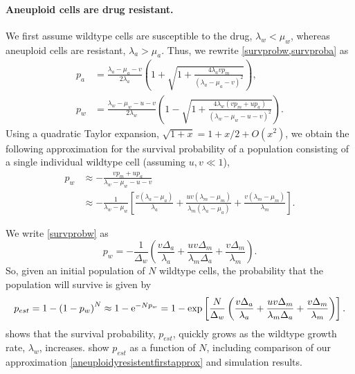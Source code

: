 \documentclass[12pt]{extarticle}
\newcommand{\e}{{\rm e}}
\begin{document}
\paragraph{Aneuploid cells are drug resistant.} 
We first assume wildtype cells are susceptible to the drug, $\lambda_w<\mu_w$, whereas aneuploid cells are resistant, $\lambda_a>\mu_a$.
Thus, we rewrite \cref{survprobw,survproba} as
\begin{align*}
p_a&=\frac{\lambda_a-\mu_a-v}{2\lambda_a}\left(1+\sqrt{1+\frac{4\lambda_avp_m}{\left(\lambda_a-\mu_a-v\right)^2}}\right),\\
p_w&=\frac{\lambda_w-\mu_w-u-v}{2\lambda_w}\left(1-\sqrt{1+\frac{4\lambda_w\left(vp_m+up_a\right)}{\left(\lambda_w-\mu_w-u-v\right)^2}}\right).
\end{align*}
Using a quadratic Taylor expansion, $\sqrt{1+x}=1+x/2+O(x^2)$, 
we obtain the following approximation for the survival probability of a population consisting of a single individual wildtype cell (assuming $u,v \ll 1$),
\begin{align}\label{survprobwinitial}
p_w 
&\approx -\frac{vp_m+up_a}{\lambda_w-\mu_w-u-v}\\
\nonumber
&\approx-\frac{1}{\lambda_w-\mu_w}\left[\frac{v\left(\lambda_a-\mu_a\right)}{\lambda_a}+\frac{uv\left(\lambda_m-\mu_m\right)}{\lambda_m\left(\lambda_a-\mu_a\right)}+\frac{v\left(\lambda_m-\mu_m\right)}{\lambda_m}\right].
\end{align}

We write \cref{survprobw} as
\begin{equation}\label{survprobwapprox1}
p_w=-\frac{1}{\Delta_w}\left(\frac{v\Delta_a}{\lambda_a}+\frac{uv\Delta_m}{\lambda_m\Delta_a}+\frac{v\Delta_m}{\lambda_m}\right).
\end{equation}
So, given an initial population of $N$ wildtype cells, the probability that the population will survive is given by
\begin{align}\label{aneuploidyresistentfirstapprox}
p_{est}=1-\left(1-p_w\right)^N\approx 1-\e^{-Np_w}=1-\exp\left[\frac{N}{\Delta_w}\left(\frac{v\Delta_a}{\lambda_a}+\frac{uv\Delta_m}{\lambda_m\Delta_a}+\frac{v\Delta_m}{\lambda_m}\right)\right] .
\end{align}
 shows that the survival probability, $p_{est}$, quickly grows as the wildtype growth rate, $\lambda_w$, increases. %
 show $p_{est}$ as a function of $N$, including comparison of our approximation \eqref{aneuploidyresistentfirstapprox} %
and simulation results.
\end{document}
